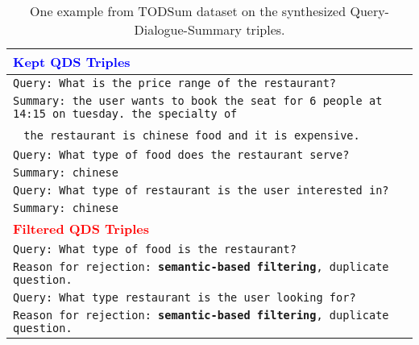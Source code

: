 \documentclass[11pt]{article}
\begin{document}
\begin{table*}[t]
\begin{adjustbox}{width=1.00\textwidth,center}
\begin{tabular}{ | l |}
        \hline \hline
        \textbf{\textcolor{blue}{Kept QDS Triples}} \\ 
        \hline
        \texttt{Query: What is the price range of the restaurant?} \\
        \texttt{Summary: the user wants to book the seat for 6 people at 14:15 on tuesday. the specialty of } \\
        \quad\quad\quad\quad~ \texttt{the restaurant is chinese food and it is expensive.} \\ \hline
        \texttt{Query: What type of food does the restaurant serve?} \\
        \texttt{Summary: chinese} \\
        \hline
        \texttt{Query: What type of restaurant is the user interested in?} \\
        \texttt{Summary: chinese}\\
        \hline \hline
        \textbf{\textcolor{red}{Filtered QDS Triples}} \\ 
        \hline
        \texttt{Query: What type of food is the restaurant?} \\
        \texttt{Reason for rejection: \textbf{semantic-based filtering}, duplicate question.} \\ \hline
        \texttt{Query: What type restaurant is the user looking for?} \\
        \texttt{Reason for rejection: \textbf{semantic-based filtering}, duplicate question.} \\
        \bottomrule
        \end{tabular}
        \end{adjustbox}
        \caption{One example from TODSum dataset on the synthesized Query-Dialogue-Summary triples.}
        \label{tab:QDS_examples_todsum}
    \end{table*}
\end{document}
